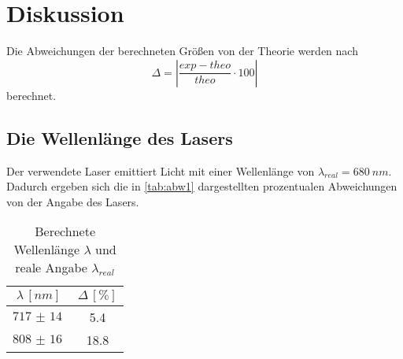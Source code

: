 \section{Diskussion}
\label{sec:Diskussion}
Die Abweichungen der berechneten Größen von der Theorie werden nach 
\begin{equation}\label{1}
    \Delta = |\frac{exp - theo}{theo} \cdot 100|
\end{equation}
berechnet.
\subsection{Die Wellenlänge des Lasers}
Der verwendete Laser emittiert Licht mit einer Wellenlänge von $\lambda_{real} = \SI{680}{nm}$. Dadurch ergeben sich die in \autoref{tab:abw1} dargestellten
prozentualen Abweichungen von der Angabe des Lasers.
\begin{table}[H]
    \centering
    \caption{Berechnete Wellenlänge $\lambda$ und reale Angabe $\lambda_{real}$}
    \begin{tabular}{c c}
        \toprule
        $\lambda \,[\unit{nm}]$ & $\Delta\,[\unit{\%}]$\\
        \midrule
        $\SI{717(14)}{}$ & 5.4\\
        $\SI{808(16)}{}$ & 18.8\\
        \bottomrule
    \end{tabular}
    \label{tab:abw1}
\end{table}
